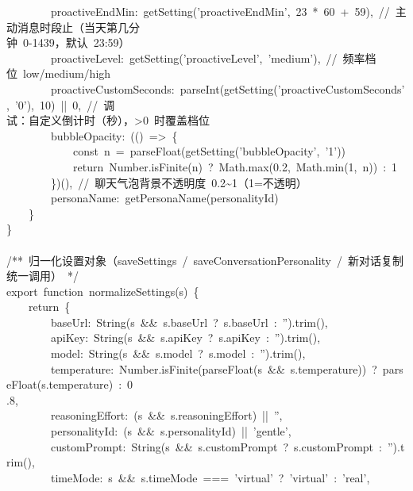 \documentclass[a4paper,10pt]{article}
\begin{document}
{~~~~~~~~proactiveEndMin:~getSetting('proactiveEndMin',~23~*~60~+~59),~//~主动消息时段止（当天第几分\\
钟~0-1439，默认~23:59）\\
~~~~~~~~proactiveLevel:~getSetting('proactiveLevel',~'medium'),~//~频率档位~low/medium/high\\
~~~~~~~~proactiveCustomSeconds:~parseInt(getSetting('proactiveCustomSeconds',~'0'),~10)~||~0,~//~调\\
试：自定义倒计时（秒），>0~时覆盖档位\\
~~~~~~~~bubbleOpacity:~(()~=>~\{\\
~~~~~~~~~~~~const~n~=~parseFloat(getSetting('bubbleOpacity',~'1'))\\
~~~~~~~~~~~~return~Number.isFinite(n)~?~Math.max(0.2,~Math.min(1,~n))~:~1\\
~~~~~~~~\})(),~//~聊天气泡背景不透明度~0.2\textasciitilde{}1（1=不透明）\\
~~~~~~~~personaName:~getPersonaName(personalityId)\\
~~~~\}\\
\}\\
\mbox{}\\
/**~归一化设置对象（saveSettings~/~saveConversationPersonality~/~新对话复制统一调用）~*/\\
export~function~normalizeSettings(s)~\{\\
~~~~return~\{\\
~~~~~~~~baseUrl:~String(s~\&\&~s.baseUrl~?~s.baseUrl~:~'').trim(),\\
~~~~~~~~apiKey:~String(s~\&\&~s.apiKey~?~s.apiKey~:~'').trim(),\\
~~~~~~~~model:~String(s~\&\&~s.model~?~s.model~:~'').trim(),\\
~~~~~~~~temperature:~Number.isFinite(parseFloat(s~\&\&~s.temperature))~?~parseFloat(s.temperature)~:~0\\
.8,\\
~~~~~~~~reasoningEffort:~(s~\&\&~s.reasoningEffort)~||~'',\\
~~~~~~~~personalityId:~(s~\&\&~s.personalityId)~||~'gentle',\\
~~~~~~~~customPrompt:~String(s~\&\&~s.customPrompt~?~s.customPrompt~:~'').trim(),\\
~~~~~~~~timeMode:~s~\&\&~s.timeMode~===~'virtual'~?~'virtual'~:~'real',
}

\newpage
\end{document}
